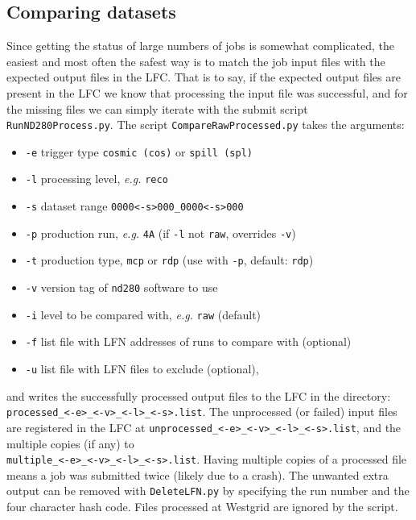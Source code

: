\documentclass[11pt]{article}
\begin{document}
\subsection{Comparing datasets}
Since getting the status of large numbers of jobs is somewhat
complicated, the easiest and most often the safest way is to match the job
input files with the expected output files in the LFC. That is to say,
if the expected output files are present in the LFC we know that
processing the input file was successful, and for the missing files we
can simply iterate with the submit script
\verb+RunND280Process.py+. The script \verb+CompareRawProcessed.py+
takes the arguments:

\begin{itemize}
\item \verb+-e+ trigger type \verb+cosmic (cos)+ or \verb+spill (spl)+
\item \verb+-l+ processing level, \textit{e.g.} \verb+reco+
\item \verb+-s+ dataset range \verb+0000<-s>000_0000<-s>000+
\item \verb+-p+ production run, \textit{e.g.} \verb+4A+ (if \verb+-l+ not \verb+raw+, overrides \verb+-v+)
\item \verb+-t+ production type, \verb+mcp+ or \verb+rdp+ (use with \verb+-p+, default: \verb+rdp+)
\item \verb+-v+ version tag of \verb+nd280+ software to use
\item \verb+-i+ level to be compared with, \textit{e.g.} \verb+raw+ (default)
\item \verb+-f+ list file with LFN addresses of runs to compare with (optional)
\item \verb+-u+ list file with LFN files to exclude (optional),
\end{itemize}

and writes the successfully processed output files to the LFC in the
directory:\\ \verb+processed_<-e>_<-v>_<-l>_<-s>.list+. The unprocessed
(or failed) input files are registered in the LFC at
\verb+unprocessed_<-e>_<-v>_<-l>_<-s>.list+, and the multiple copies
(if any) to\\ \verb+multiple_<-e>_<-v>_<-l>_<-s>.list+. Having multiple
copies of a processed file means a job was submitted twice (likely due
to a crash). The unwanted extra output can be removed with
\verb+DeleteLFN.py+ by specifying the run number and the four
character hash code. Files processed at Westgrid are ignored by the script.
\end{document}

